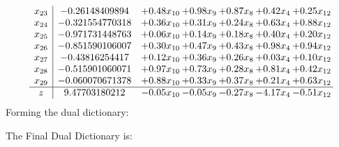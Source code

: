 \documentclass[8pt]{article}
\begin{document}
\[\begin{array}{c| c c@{\hskip 2pt} c@{\hskip 2pt} c@{\hskip 2pt} c@{\hskip 2pt} c@{\hskip 2pt} }
 x_{23}   &  -0.26148409894 & +  0.48 x_{10} & +  0.98 x_{9} & +  0.87 x_{8} & +  0.42 x_{4} & +  0.25 x_{12}\\
 x_{24}   &  -0.321554770318 & +  0.36 x_{10} & +  0.31 x_{9} & +  0.24 x_{8} & +  0.63 x_{4} & +  0.88 x_{12}\\
 x_{25}   &  -0.971731448763 & +  0.06 x_{10} & +  0.14 x_{9} & +  0.18 x_{8} & +  0.40 x_{4} & +  0.20 x_{12}\\
 x_{26}   &  -0.851590106007 & +  0.30 x_{10} & +  0.47 x_{9} & +  0.43 x_{8} & +  0.98 x_{4} & +  0.94 x_{12}\\
 x_{27}   &  -0.43816254417 & +  0.12 x_{10} & +  0.36 x_{9} & +  0.26 x_{8} & +  0.03 x_{4} & +  0.10 x_{12}\\
 x_{28}   &  -0.515901060071 & +  0.97 x_{10} & +  0.73 x_{9} & +  0.28 x_{8} & +  0.81 x_{4} & +  0.42 x_{12}\\
 x_{29}   &  -0.060070671378 & +  0.88 x_{10} & +  0.33 x_{9} & +  0.37 x_{8} & +  0.21 x_{4} & +  0.63 x_{12}\\
\hline
z    &  9.47703180212 & -0.05 x_{10} & -0.05 x_{9} & -0.27 x_{8} & -4.17 x_{4} & -0.51 x_{12}\\
\end{array}\]
Forming the dual dictionary:

The Final Dual Dictionary is: 
\end{document}
